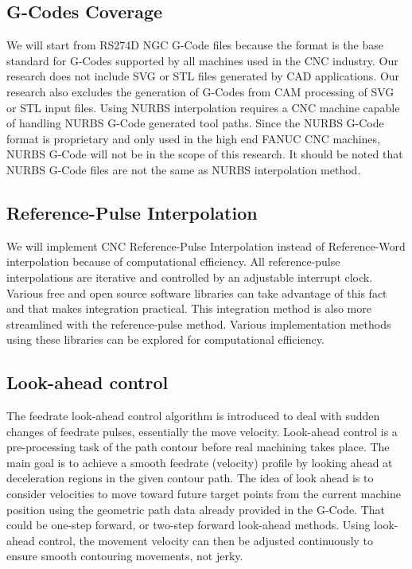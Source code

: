 \subsection{G-Codes Coverage}
We will start from RS274D NGC G-Code files because the format is the base standard for G-Codes supported by all machines used in the CNC industry. Our research does not include SVG or STL files generated by CAD applications. Our research also excludes the generation of G-Codes from CAM processing of SVG or STL input files. Using NURBS interpolation requires a CNC machine capable of handling NURBS G-Code generated tool paths. Since the NURBS G-Code format is proprietary and only used in the high end FANUC CNC machines, NURBS G-Code will not  be in the scope of this research. It should be noted that NURBS G-Code files are not the same as NURBS interpolation method.

\subsection{Reference-Pulse Interpolation}
We will implement CNC Reference-Pulse Interpolation instead of Reference-Word interpolation because of computational efficiency. All reference-pulse interpolations are iterative and controlled by an adjustable interrupt clock. Various free and open source software libraries can take advantage of this fact and that makes integration practical. This integration method is also more streamlined with the reference-pulse method. Various implementation methods using these libraries can be explored for computational efficiency.  

\subsection{Look-ahead control}
The feedrate look-ahead control algorithm is introduced to deal with sudden changes of feedrate pulses, essentially the move velocity. Look-ahead control is a pre-processing task of the path contour before real machining takes place. The main goal is to achieve a smooth feedrate (velocity) profile by looking ahead at deceleration regions in the given contour path. The idea of look ahead is to consider velocities to move toward future target points from the current machine position using the geometric path data already provided in the G-Code. That could be one-step forward, or two-step forward look-ahead methods. Using look-ahead control, the movement velocity can then be adjusted continuously to ensure smooth contouring movements, not jerky.

